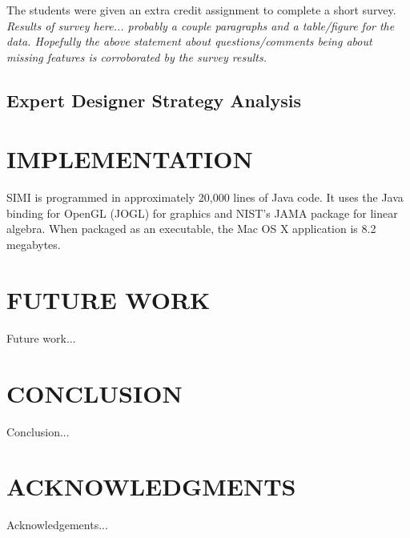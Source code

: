 \documentclass{article}
\begin{document}
The students were given an extra credit assignment to complete a short
survey. \textit{Results of survey here... probably a couple paragraphs
  and a table/figure for the data. Hopefully the above statement about
  questions/comments being about missing features is corroborated by
  the survey results.}

\subsection{Expert Designer Strategy Analysis}



\section{IMPLEMENTATION}

SIMI is programmed in approximately 20,000 lines of Java code. It uses
the Java binding for OpenGL (JOGL) for graphics and NIST's JAMA
package for linear algebra. When packaged as an executable, the Mac OS
X application is 8.2 megabytes.

\section{FUTURE WORK}

Future work...

\section{CONCLUSION}

Conclusion...

\section{ACKNOWLEDGMENTS}


Acknowledgements...


\end{document}
